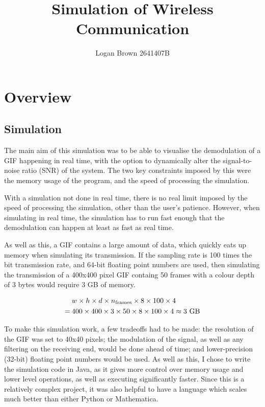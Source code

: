 \documentclass{article}
\title{Simulation of Wireless Communication}
\author{Logan Brown 2641407B}
\begin{document}
\maketitle
\section{Overview}
\subsection{Simulation}
The main aim of this simulation was to be able to visualise the demodulation of a GIF happening in real time, with the option to dynamically alter the signal-to-noise ratio (SNR) of the system. The two key constraints imposed by this were the memory usage of the program, and the speed of processing the simulation. 

With a simulation not done in real time, there is no real limit imposed by the speed of processing the simulation, other than the user's patience. However, when simulating in real time, the simulation has to run fast enough that the demodulation can happen at least as fast as real time. 

As well as this, a GIF contains a large amount of data, which quickly eats up memory when simulating its transmission. If the sampling rate is 100 times the bit transmission rate, and 64-bit floating point numbers are used, then simulating the transmission of a 400x400 pixel GIF containg 50 frames with a colour depth of 3 bytes would require 3 GB of memory.

\begin{equation}
    \begin{aligned}
        & w \times h \times d \times n_{\text{frames}} \times 8 \times 100 \times 4 \\ 
        = \: & 400 \times 400 \times 3 \times 50 \times 8 \times 100 \times 4 \approx 3 \text{ GB} \notag
    \end{aligned}
\end{equation}

To make this simulation work, a few tradeoffs had to be made: the resolution of the GIF was set to 40x40 pixels; the modulation of the signal, as well as any filtering on the receiving end, would be done ahead of time; and lower-precision (32-bit) floating point numbers would be used. As well as this, I chose to write the simulation code in Java, as it gives more control over memory usage and lower level operations, as well as executing significantly faster. Since this is a relatively complex project, it was also helpful to have a language which scales much better than either Python or Mathematica.
\end{document}
